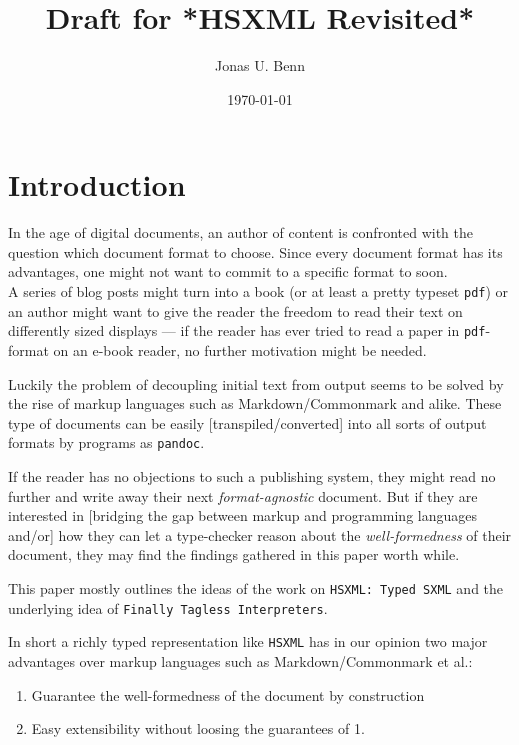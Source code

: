 \documentclass[format=acmsmall, review=true, screen=true]{acmart}
\author{Jonas U. Benn}
\date{\today}
\title[Draft for *HSXML Revisited*]{Draft for *HSXML Revisited*}
\begin{document}
\lstset{language=Haskell}

\maketitle


\section{Introduction}
\label{sec:orgc140eeb}

In the age of digital documents, an author of content is confronted with the
question which document format to choose. Since every document format has its
advantages, one might not want to commit to a specific format to soon. \\
A series of blog posts might turn into a book (or at least a pretty typeset
\texttt{pdf}) or an author might want to give the reader the freedom to read
their text on differently sized displays — if the reader has ever tried to read
a paper in \texttt{pdf}-format on an e-book reader, no further motivation might
be needed.

Luckily the problem of decoupling initial text from output seems to be solved by
the rise of markup languages such as Markdown/Commonmark and alike. These type
of documents can be easily [transpiled/converted] into all sorts of output
formats by programs as \texttt{pandoc}.

If the reader has no objections to such a publishing system, they might read no
further and write away their next \emph{format-agnostic} document. But if they are
interested in [bridging the gap between markup and programming languages and/or]
how they can let a type-checker reason about the \emph{well-formedness} of their
document, they may find the findings gathered in this paper worth while.

This paper mostly outlines the ideas of the work on \texttt{HSXML: Typed SXML} and the
underlying idea of \texttt{Finally Tagless Interpreters}.

In short a richly typed representation like \texttt{HSXML} has in our opinion two major
advantages over markup languages such as Markdown/Commonmark et al.:

\begin{enumerate}
\item Guarantee the well-formedness of the document by construction
\item Easy extensibility without loosing the guarantees of 1.
\end{enumerate}
\end{document}
